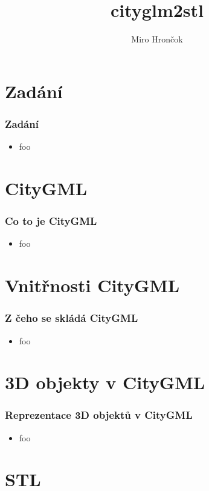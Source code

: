 \documentclass{beamer}
\title{cityglm2stl}
\author{Miro Hrončok}
\institute[IF2015]{FSv ČVUT}
\begin{document}
\begin{frame}
  \titlepage
\end{frame}

\section{Zadání}

\begin{frame}
  \frametitle{Zadání}
    \begin{itemize}[<+->]
      \item foo
    \end{itemize}
\end{frame}

\section{CityGML}

\begin{frame}
  \frametitle{Co to je CityGML}
    \begin{itemize}[<+->]
      \item foo
    \end{itemize}
\end{frame}

\section{Vnitřnosti CityGML}

\begin{frame}
  \frametitle{Z čeho se skládá CityGML}
    \begin{itemize}[<+->]
      \item foo
    \end{itemize}
\end{frame}

\section{3D objekty v CityGML}

\begin{frame}
  \frametitle{Reprezentace 3D objektů v CityGML}
    \begin{itemize}[<+->]
      \item foo
    \end{itemize}
\end{frame}

\section{STL}
\end{document}
